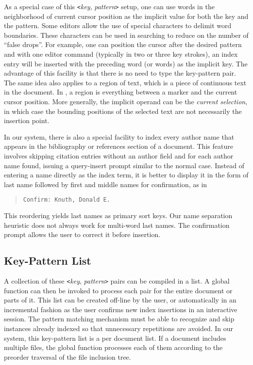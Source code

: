 As a special case of this \verb|<|{\it key\/}, {\it pattern\/}\verb|>|
setup, one can use words in the neighborhood of current cursor position
as the implicit value for both the key and the pattern.
Some editors allow the use of special characters to delimit word boundaries.
These characters can be used in searching to reduce on the number of
``false drops''.  For example, one can position the cursor
after the desired pattern and with one editor command (typically
in two or three key strokes), an index entry will
be inserted with the preceding word (or words) as the implicit key.
The advantage of this facility is that there is no need to type
the key-pattern pair.
The same idea also applies to a region of text, which is a piece of
continuous text in the document.  In {\E}, a region is
everything between a marker and the current cursor position.
More generally, the implicit operand can be the {\it current selection\/},
in which case the bounding positions of the selected text
are not necessarily the insertion point.

In our system, there is also a special facility to index every author name
that appears in the bibliography or references section of a document.
This feature involves skipping citation entries without an author field and
for each author name found, issuing a query-insert prompt similar to
the normal case.  Instead of entering a name directly as the index term,
it is better to display it in the form of last name followed by first
and middle names for confirmation, as in
\begin{quote}
\verb|Confirm: Knuth, Donald E.|
\end{quote}
This reordering yields last names as primary sort keys.
Our name separation heuristic does not always
work for multi-word last names.  The confirmation prompt
allows the user to correct it before insertion.

\subsection{Key-Pattern List}
A collection of these \verb|<|{\it key\/}, {\it pattern\/}\verb|>| pairs
can be compiled in a list.  A global function can then be invoked to
process each pair for the entire document or parts of it.
This list can be created off-line by the user, or automatically
in an incremental fashion as the
user confirms new index insertions in an interactive session.  The pattern
matching mechanism must be able to recognize and skip instances already
indexed so that unnecessary repetitions are avoided.
In our system, this key-pattern list is a per document list.
If a document includes multiple files, the global function processes
each of them according to the preorder traversal of the file inclusion tree.


